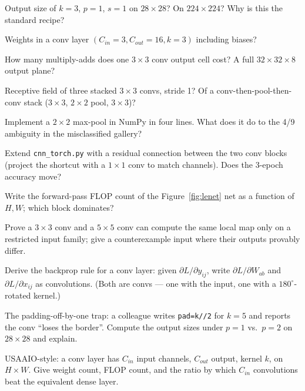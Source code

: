 \begin{exercise}[{[easy]}]
Output size of $k{=}3$, $p{=}1$, $s{=}1$ on $28\times28$? On
$224\times224$? Why is this the standard recipe?
\end{exercise}
\begin{exercise}[{[easy]}]
Weights in a conv layer $(C_{in}{=}3, C_{out}{=}16, k{=}3)$ including
biases?
\end{exercise}
\begin{exercise}[{[easy]}]
How many multiply-adds does one $3\times3$ conv output cell cost? A
full $32\times32\times8$ output plane?
\end{exercise}
\begin{exercise}[{[medium]}]
Receptive field of three stacked $3\times3$ convs, stride 1? Of a
conv-then-pool-then-conv stack ($3\times3$, $2\times2$ pool,
$3\times3$)?
\end{exercise}
\begin{exercise}[{[medium]}]
Implement a $2\times2$ max-pool in NumPy in four lines. What does it
do to the 4/9 ambiguity in the misclassified gallery?
\end{exercise}
\begin{exercise}[{[medium]}]
Extend \texttt{cnn\_torch.py} with a residual connection between the
two conv blocks (project the shortcut with a $1\times1$ conv to match
channels). Does the 3-epoch accuracy move?
\end{exercise}
\begin{exercise}[{[medium]}]
Write the forward-pass FLOP count of the Figure~\ref{fig:lenet} net as
a function of $H,W$; which block dominates?
\end{exercise}
\begin{exercise}[{[hard]}]
Prove a $3\times3$ conv and a $5\times5$ conv can compute the same
local map only on a restricted input family; give a counterexample
input where their outputs provably differ.
\end{exercise}
\begin{exercise}[{[hard]}]
Derive the backprop rule for a conv layer: given
$\partial L/\partial y_{ij}$, write $\partial L/\partial W_{ab}$ and
$\partial L/\partial x_{ij}$ as convolutions. (Both are convs --- one
with the input, one with a $180^\circ$-rotated kernel.)
\end{exercise}
\begin{exercise}[{[hard]}]
The padding-off-by-one trap: a colleague writes
\texttt{pad=k//2} for $k{=}5$ and reports the conv ``loses the
border''. Compute the output sizes under $p{=}1$ vs.\ $p{=}2$ on
$28\times28$ and explain.
\end{exercise}
\begin{exercise}[{[hard]}]
USAAIO-style: a conv layer has $C_{in}$ input channels, $C_{out}$
output, kernel $k$, on $H\times W$. Give weight count, FLOP count,
and the ratio by which $C_{in}$ convolutions beat the equivalent dense
layer.
\end{exercise}

